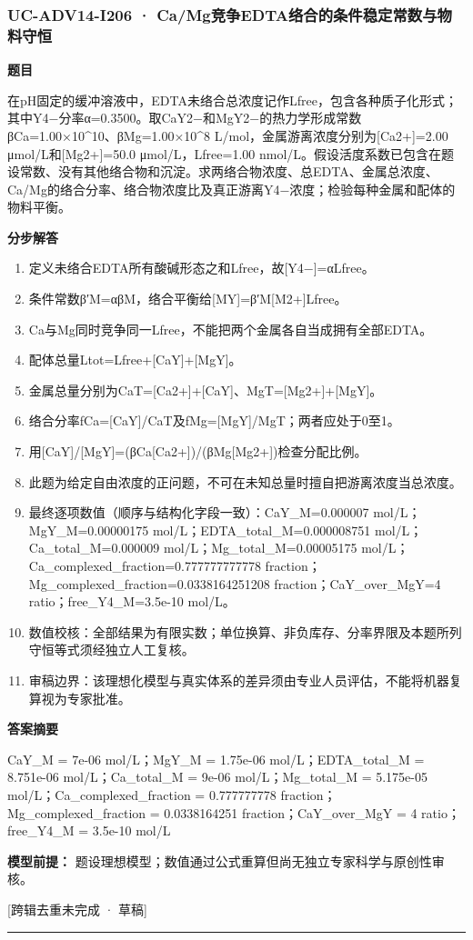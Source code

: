 \documentclass[UTF8,11pt,a4paper]{ctexart}
\begin{document}
\subsubsection*{UC-ADV14-I206 · Ca/Mg竞争EDTA络合的条件稳定常数与物料守恒}
\noindent\textbf{题目}\par
在pH固定的缓冲溶液中，EDTA未络合总浓度记作Lfree，包含各种质子化形式；其中Y4−分率α=0.3500。取CaY2−和MgY2−的热力学形成常数βCa=1.00×10\textasciicircum{}10、βMg=1.00×10\textasciicircum{}8 L/mol，金属游离浓度分别为[Ca2+]=2.00 μmol/L和[Mg2+]=50.0 μmol/L，Lfree=1.00 nmol/L。假设活度系数已包含在题设常数、没有其他络合物和沉淀。求两络合物浓度、总EDTA、金属总浓度、Ca/Mg的络合分率、络合物浓度比及真正游离Y4−浓度；检验每种金属和配体的物料平衡。\par
\medskip\noindent\textbf{分步解答}
\begin{enumerate}
\item 定义未络合EDTA所有酸碱形态之和Lfree，故[Y4−]=αLfree。
\item 条件常数β′M=αβM，络合平衡给[MY]=β′M[M2+]Lfree。
\item Ca与Mg同时竞争同一Lfree，不能把两个金属各自当成拥有全部EDTA。
\item 配体总量Ltot=Lfree+[CaY]+[MgY]。
\item 金属总量分别为CaT=[Ca2+]+[CaY]、MgT=[Mg2+]+[MgY]。
\item 络合分率fCa=[CaY]/CaT及fMg=[MgY]/MgT；两者应处于0至1。
\item 用[CaY]/[MgY]=(βCa[Ca2+])/(βMg[Mg2+])检查分配比例。
\item 此题为给定自由浓度的正问题，不可在未知总量时擅自把游离浓度当总浓度。
\item 最终逐项数值（顺序与结构化字段一致）：CaY\_M=0.000007 mol/L；MgY\_M=0.00000175 mol/L；EDTA\_total\_M=0.000008751 mol/L；Ca\_total\_M=0.000009 mol/L；Mg\_total\_M=0.00005175 mol/L；Ca\_complexed\_fraction=0.777777777778 fraction；Mg\_complexed\_fraction=0.0338164251208 fraction；CaY\_over\_MgY=4 ratio；free\_Y4\_M=3.5e-10 mol/L。
\item 数值校核：全部结果为有限实数；单位换算、非负库存、分率界限及本题所列守恒等式须经独立人工复核。
\item 审稿边界：该理想化模型与真实体系的差异须由专业人员评估，不能将机器复算视为专家批准。
\end{enumerate}
\noindent\textbf{答案摘要}\par
CaY\_M = 7e-06 mol/L；MgY\_M = 1.75e-06 mol/L；EDTA\_total\_M = 8.751e-06 mol/L；Ca\_total\_M = 9e-06 mol/L；Mg\_total\_M = 5.175e-05 mol/L；Ca\_complexed\_fraction = 0.777777778 fraction；Mg\_complexed\_fraction = 0.0338164251 fraction；CaY\_over\_MgY = 4 ratio；free\_Y4\_M = 3.5e-10 mol/L\par
\noindent\textbf{模型前提：}
题设理想模型；数值通过公式重算但尚无独立专家科学与原创性审核。\par
\noindent\textcolor{red!65!black}{[跨辑去重未完成 · 草稿]} \par
\medskip\hrule\medskip
{}
\end{document}
